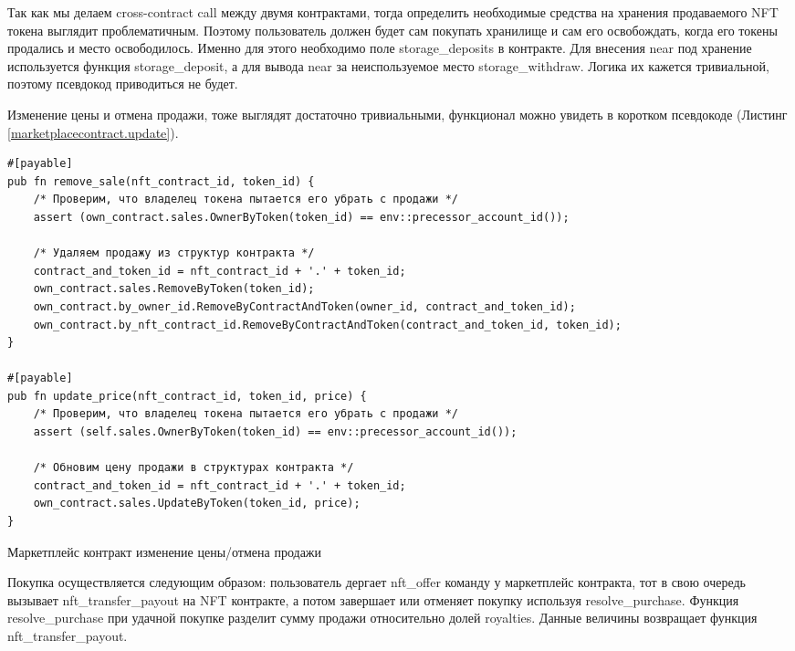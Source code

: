 Так как мы делаем cross-contract call между двумя контрактами, тогда определить необходимые средства на хранения продаваемого NFT токена выглядит проблематичным.
Поэтому пользователь должен будет сам покупать хранилище и сам его освобождать, когда его токены продались и место освободилось. Именно для этого необходимо поле storage\_deposits в контракте.
Для внесения near под хранение используется функция storage\_deposit, а для вывода near за неиспользуемое место storage\_withdraw. Логика их кажется тривиальной, поэтому псевдокод приводиться не будет.

Изменение цены и отмена продажи, тоже выглядят достаточно тривиальными, функционал можно увидеть в коротком псевдокоде (Листинг {\color{blue}\ref{marketplacecontract.update}}).

\begin{listing}
\begin{verbatim}
#[payable]
pub fn remove_sale(nft_contract_id, token_id) {
    /* Проверим, что владелец токена пытается его убрать с продажи */
    assert (own_contract.sales.OwnerByToken(token_id) == env::precessor_account_id());

    /* Удаляем продажу из структур контракта */
    contract_and_token_id = nft_contract_id + '.' + token_id;
    own_contract.sales.RemoveByToken(token_id);
    own_contract.by_owner_id.RemoveByContractAndToken(owner_id, contract_and_token_id);
    own_contract.by_nft_contract_id.RemoveByContractAndToken(contract_and_token_id, token_id);
}

#[payable]
pub fn update_price(nft_contract_id, token_id, price) {
    /* Проверим, что владелец токена пытается его убрать с продажи */
    assert (self.sales.OwnerByToken(token_id) == env::precessor_account_id());

    /* Обновим цену продажи в структурах контракта */
    contract_and_token_id = nft_contract_id + '.' + token_id;
    own_contract.sales.UpdateByToken(token_id, price);
}
\end{verbatim}
\caption{Маркетплейс контракт изменение цены/отмена продажи}
\label{marketplacecontract.update}
\end{listing}

Покупка осуществляется следующим образом: пользователь дергает nft\_offer команду у маркетплейс контракта, тот в свою очередь вызывает nft\_transfer\_payout на NFT контракте, а потом завершает или отменяет покупку используя resolve\_purchase.
Функция resolve\_purchase при удачной покупке разделит сумму продажи относительно долей royalties. Данные величины возвращает функция nft\_transfer\_payout.

